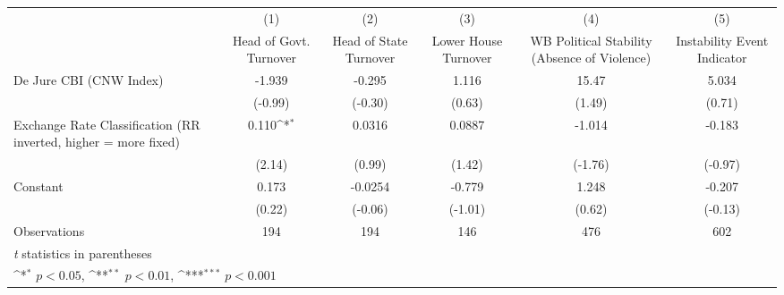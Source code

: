 {
\def\sym#1{\ifmmode^{#1}\else\(^{#1}\)\fi}
\begin{tabular*}{\linewidth}{@{\hskip\tabcolsep\extracolsep\fill}l*{5}{c}}
\hline\hline
                &\multicolumn{1}{c}{(1)}&\multicolumn{1}{c}{(2)}&\multicolumn{1}{c}{(3)}&\multicolumn{1}{c}{(4)}&\multicolumn{1}{c}{(5)}\\
                &\multicolumn{1}{c}{Head of Govt. Turnover}&\multicolumn{1}{c}{Head of State Turnover}&\multicolumn{1}{c}{Lower House Turnover}&\multicolumn{1}{c}{WB Political Stability (Absence of Violence)}&\multicolumn{1}{c}{Instability Event Indicator}\\
\hline
De Jure CBI (CNW Index)&   -1.939         &   -0.295         &    1.116         &    15.47         &    5.034         \\
                &  (-0.99)         &  (-0.30)         &   (0.63)         &   (1.49)         &   (0.71)         \\
[1em]
Exchange Rate Classification (RR inverted, higher = more fixed)&    0.110\sym{*}  &   0.0316         &   0.0887         &   -1.014         &   -0.183         \\
                &   (2.14)         &   (0.99)         &   (1.42)         &  (-1.76)         &  (-0.97)         \\
[1em]
Constant        &    0.173         &  -0.0254         &   -0.779         &    1.248         &   -0.207         \\
                &   (0.22)         &  (-0.06)         &  (-1.01)         &   (0.62)         &  (-0.13)         \\
\hline
Observations    &      194         &      194         &      146         &      476         &      602         \\
\hline\hline
\multicolumn{6}{l}{\footnotesize \textit{t} statistics in parentheses}\\
\multicolumn{6}{l}{\footnotesize \sym{*} \(p<0.05\), \sym{**} \(p<0.01\), \sym{***} \(p<0.001\)}\\
\end{tabular*}
}
